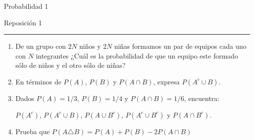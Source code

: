 \documentclass[12pt]{report}
\begin{document}
\begin{center}
    \textsf{\Large Probabilidad 1}
    \par\medskip
    \textsf{\large Reposición 1}
\end{center}
\hrule
\par\bigskip

\begin{enumerate}
    \item De un grupo con $2N$ niños y $2N$ niñas formamos un par de equipos cada uno con $N$ integrantes ¿Cuál es la probabilidad de que un equipo este formado sólo de niños y el otro sólo de niñas?
    \item En términos de $P(A)$, $P(B)$ y $P(A\cap B)$, expresa $P(A^c\cup B)$.
    \item Dados $P(A) = 1/3$, $P(B) = 1/4$ y $P(A\cap B) = 1/6$, encuentra:
     
    $P(A^c)$, $P(A^c\cup B)$, $P(A\cup B^c)$, $P(A^c\cup B^c)$ y $P(A\cap B^c)$.
    \item  Prueba que $P(A \triangle B) = P(A) + P(B) -2P(A\cap B)$
\end{enumerate}
\end{document}
